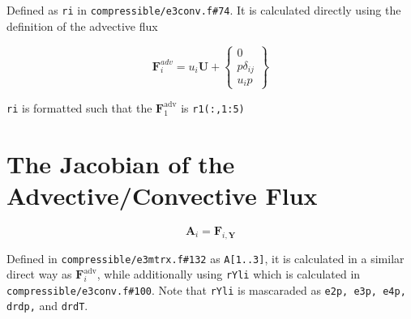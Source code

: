 \documentclass[12pt, letterpaper, twoside]{article}
\renewcommand{\vec}[1]{\bm{#1}}
\newcommand{\ttt}[1]{\texttt{#1}}
\newcommand{\U}{\vec{U}}
\newcommand{\A}{\vec{A}}
\newcommand{\F}{\vec{F}}
\newcommand{\0}{\vec{0}}
\begin{document}
    Defined as \ttt{ri} in \ttt{compressible/e3conv.f\#74}. It is calculated directly using the definition of the advective flux

    \begin{equation}
        \F_i^{adv}  = 
        u_i \U
        + \begin{Bmatrix}
            0 \\
            p \delta_{ij}\\
            u_i p
        \end{Bmatrix} 
    \end{equation}

    \ttt{ri} is formatted such that the \(\F_1^{\text{adv}}\) is \ttt{r1(:,1:5)}

\section{The Jacobian of the Advective/Convective Flux}
    \begin{equation}
        \A_i = \F_{i,\vec{Y}}
    \end{equation}


    Defined in \ttt{compressible/e3mtrx.f\#132} as \ttt{A[1..3]}, it is calculated in a similar direct way as \(\F_i^{\text{adv}}\), while additionally using \ttt{rYli} which is calculated in \ttt{compressible/e3conv.f\#100}. Note that \ttt{rYli} is mascaraded as \ttt{e2p, e3p, e4p, drdp,} and \ttt{drdT}.
\end{document}
